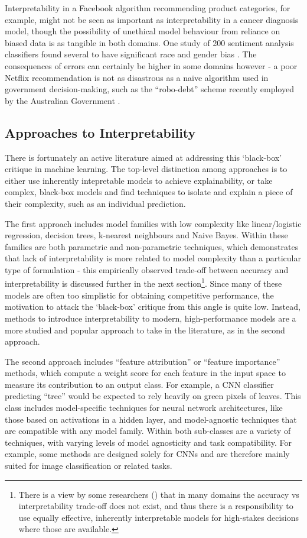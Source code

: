 \documentclass[main]{subfiles}
\begin{document}
Interpretability in a Facebook algorithm recommending product categories, for example, might not be seen as important as interpretability in a cancer diagnosis model, though the possibility of unethical model behaviour from reliance on biased data is as tangible in both domains. One study of 200 sentiment analysis classifiers found several to have significant race and gender bias \cite{bias}. The consequences of errors can certainly be higher in some domains however - a poor Netflix recommendation is not as disastrous as a naive algorithm used in government decision-making, such as the ``robo-debt'' scheme recently employed by the Australian Government \cite{nous}.

\subsection*{Approaches to Interpretability}

There is fortunately an active literature aimed at addressing this `black-box' critique in machine learning. The top-level distinction among approaches is to either use inherently intepretable models to achieve explainability, or take complex, black-box models and find techniques to isolate and explain a piece of their complexity, such as an individual prediction.

The first approach includes model families with low complexity like linear/logistic regression, decision trees, k-nearest neighbours and Naive Bayes. Within these families are both parametric and non-parametric techniques, which demonstrates that lack of interpretability is more related to model complexity than a particular type of formulation - this empirically observed trade-off between accuracy and interpretability is discussed further in the next section\footnote{There is a view by some researchers (\cite{rudin}) that in many domains the accuracy vs interpretability trade-off does not exist, and thus there is a responsibility to use equally effective, inherently interpretable models for high-stakes decisions where those are available.}. Since many of these models are often too simplistic for obtaining competitive performance, the motivation to attack the `black-box' critique from this angle is quite low. Instead, methods to introduce interpretability to modern, high-performance models are a more studied and popular approach to take in the literature, as in the second approach.

The second approach includes ``feature attribution'' or ``feature importance'' methods, which compute a weight score for each feature in the input space to measure its contribution to an output class. For example, a CNN classifier predicting ``tree'' would be expected to rely heavily on green pixels of leaves. This class includes model-specific techniques for neural network architectures, like those based on activations in a hidden layer, and model-agnostic techniques that are compatible with any model family. Within both sub-classes are a variety of techniques, with varying levels of model agnosticity and task compatibility. For example, some methods are designed solely for CNNs and are therefore mainly suited for image classification or related tasks. 
\end{document}
